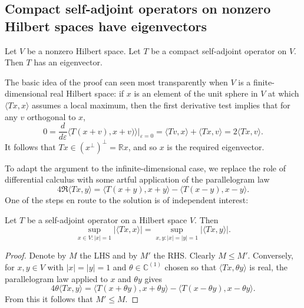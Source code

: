 \documentclass[reqno]{amsart} 
\def\eps{\varepsilon}
\begin{document}
\subsection{Compact self-adjoint operators on nonzero Hilbert spaces have eigenvectors}
\label{sec:org816b98f}
\begin{theorem}\label{thm:compact-self-adj-has-eigencetor}
  Let $V$ be a nonzero Hilbert space.
  Let $T$ be a compact self-adjoint operator on $V$.
  Then $T$ has an eigenvector.
\end{theorem}
The basic idea of the proof can seen most transparently when $V$ is a
finite-dimensional real Hilbert space:
if $x$ is an element of the unit sphere in $V$
at which $\langle T x, x \rangle$ assumes a local maximum,
then the first derivative test implies that for any $v$ orthogonal to $x$,
\begin{equation*}
0 = \frac{d}{d \eps } \langle T (x + v), x + v)
\rangle|_{\eps=0} = \langle T v, x \rangle + \langle T x, v
\rangle = 2 \langle T x, v \rangle.
\end{equation*}
It follows that $T x \in (x^\perp)^\perp = \mathbb{R} x$, and
so $x$ is the required eigenvector.  

To adapt the argument to the infinite-dimensional
case, we replace the role of differential calculus
with some artful application of the parallelogram law
\begin{equation*}
4 \Re  \langle T x, y \rangle
= \langle T(x+ y), x + y  \rangle
- \langle T(x- y), x- y \rangle.
\end{equation*}
One of the steps en route to the solution
is of independent interest:
\begin{lemma}
  Let $T$ be a self-adjoint operator on a Hilbert space $V$.
  Then
  \begin{equation*}
  \sup_{x \in V : |x| = 1} |\langle T x, x \rangle|
  =
  \sup_{x,y: |x|=|y| = 1} |\langle T x, y \rangle|.
  \end{equation*}
\end{lemma}
\begin{proof}
  Denote by $M$ the LHS and by $M'$ the RHS.
  Clearly $M \leq M'$.
  Conversely,
  for $x,y \in V$ with $|x| = |y| = 1$
  and $\theta \in \mathbb{C}^{(1)}$
  chosen so that
  $\langle T x, \theta y \rangle$ is real,
  the parallelogram law applied to $x$ and $\theta y$
  gives
  \begin{equation*}
  4 \theta  \langle T x, y \rangle
  = \langle T(x+ \theta  y), x + \theta y  \rangle
  - \langle T(x-\theta y), x-\theta y \rangle.
  \end{equation*}
  From this it follows that $M' \leq M$.
\end{proof}
\end{document}

